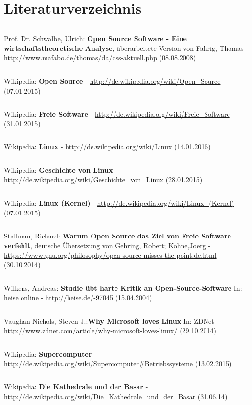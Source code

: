 \documentclass[a4paper,12pt]{article}
\begin{document}
\section{Literaturverzeichnis}
\begin{verbatim}
\end{verbatim}
Prof. Dr. Schwalbe, Ulrich: \textbf{Open Source Software - Eine wirtschaftstheoretische}
\newline
\textbf{Analyse}, überarbeitete Version von Fahrig, Thomas -
\newline
\url{http://www.mafabo.de/thomas/da/oss-aktuell.php} (08.08.2008)
\begin{verbatim}
\end{verbatim}
Wikipedia: \textbf{Open Source} - \url{http://de.wikipedia.org/wiki/Open_Source} (07.01.2015)
\begin{verbatim}
\end{verbatim}
Wikipedia: \textbf{Freie Software} - \url{http://de.wikipedia.org/wiki/Freie_Software} (31.01.2015)
\begin{verbatim}
\end{verbatim}
Wikipedia: \textbf{Linux} - \url{http://de.wikipedia.org/wiki/Linux} (14.01.2015)
\begin{verbatim}
\end{verbatim}
Wikipedia: \textbf{Geschichte von Linux} - \url{http://de.wikipedia.org/wiki/Geschichte_von_Linux} (28.01.2015)
\begin{verbatim}
\end{verbatim}
Wikipedia: \textbf{Linux (Kernel)} - \url{http://de.wikipedia.org/wiki/Linux_(Kernel)} (07.01.2015)
\begin{verbatim}
\end{verbatim}
Stallman, Richard: \textbf{Warum Open Source das Ziel von Freie Software verfehlt}, deutsche Übersetzung von Gehring, Robert; Kohne,Joerg - 
\newline
\url{https://www.gnu.org/philosophy/open-source-misses-the-point.de.html} (30.10.2014)
\begin{verbatim}
\end{verbatim}
Wilkens, Andreas: \textbf{Studie übt harte Kritik an Open-Source-Software} In: heise online - 
\newline
\url{http://heise.de/-97045} (15.04.2004)
\begin{verbatim}
\end{verbatim}
Vaughan-Nichols, Steven J.:\textbf{Why Microsoft loves Linux} In: ZDNet -
\newline
\url{http://www.zdnet.com/article/why-microsoft-loves-linux/} (29.10.2014)
\begin{verbatim}
\end{verbatim}
Wikipedia: \textbf{Supercomputer} - \url{http://de.wikipedia.org/wiki/Supercomputer#Betriebssysteme} (13.02.2015)
\begin{verbatim}
\end{verbatim}
Wikipedia: \textbf{Die Kathedrale und der Basar} - \\
\url{http://de.wikipedia.org/wiki/Die_Kathedrale_und_der_Basar} (31.06.14)
\end{document}
